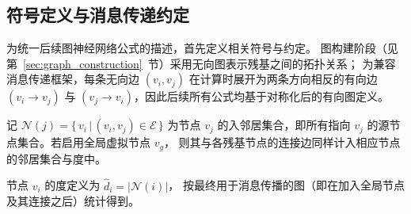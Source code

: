 \subsection{符号定义与消息传递约定}
\label{sec:notation}

为统一后续图神经网络公式的描述，首先定义相关符号与约定。
图构建阶段（见第~\ref{sec:graph_construction}~节）采用无向图表示残基之间的拓扑关系；
为兼容消息传递框架，每条无向边 $(v_i,v_j)$ 在计算时展开为两条方向相反的有向边
$(v_i\rightarrow v_j)$ 与 $(v_j\rightarrow v_i)$，因此后续所有公式均基于对称化后的有向图定义。

记 $\mathcal{N}(j)=\big\{\,v_i\,\big|\,(v_i,v_j)\in\mathcal{E}\,\big\}$ 为节点 $v_j$
的入邻居集合，即所有指向 $v_j$ 的源节点集合。若启用全局虚拟节点 $v_g$，
则其与各残基节点的连接边同样计入相应节点的邻居集合与度中。

节点 $v_i$ 的度定义为 $\hat{d}_i=\big|\mathcal{N}(i)\big|$，
按最终用于消息传播的图（即在加入全局节点及其连接之后）统计得到。
